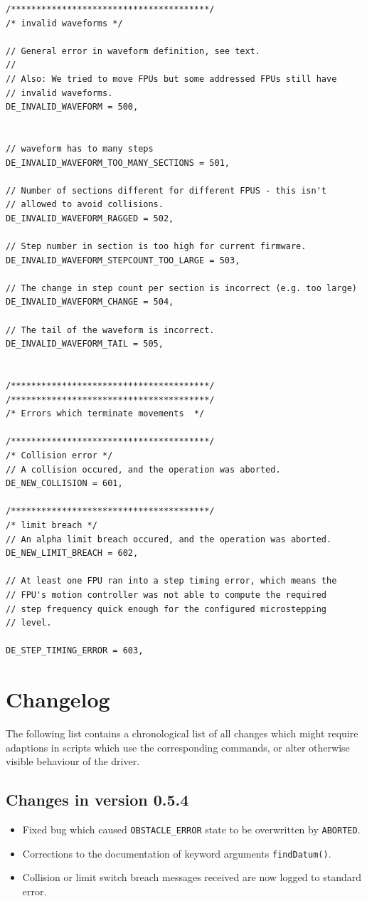 \documentclass[11pt,a4paper]{report}
\begin{document}
\begin{verbatim}
/***************************************/
/* invalid waveforms */

// General error in waveform definition, see text.
//
// Also: We tried to move FPUs but some addressed FPUs still have
// invalid waveforms.
DE_INVALID_WAVEFORM = 500,


// waveform has to many steps
DE_INVALID_WAVEFORM_TOO_MANY_SECTIONS = 501,

// Number of sections different for different FPUS - this isn't
// allowed to avoid collisions.
DE_INVALID_WAVEFORM_RAGGED = 502,

// Step number in section is too high for current firmware.
DE_INVALID_WAVEFORM_STEPCOUNT_TOO_LARGE = 503,

// The change in step count per section is incorrect (e.g. too large)
DE_INVALID_WAVEFORM_CHANGE = 504,

// The tail of the waveform is incorrect.
DE_INVALID_WAVEFORM_TAIL = 505,


/***************************************/
/***************************************/
/* Errors which terminate movements  */

/***************************************/
/* Collision error */
// A collision occured, and the operation was aborted.
DE_NEW_COLLISION = 601,

/***************************************/
/* limit breach */
// An alpha limit breach occured, and the operation was aborted.
DE_NEW_LIMIT_BREACH = 602,

// At least one FPU ran into a step timing error, which means the
// FPU's motion controller was not able to compute the required
// step frequency quick enough for the configured microstepping
// level.

DE_STEP_TIMING_ERROR = 603,
\end{verbatim}

\section{Changelog}

The following list contains a chronological list of all changes which
might require adaptions in scripts which use the corresponding
commands, or alter otherwise visible behaviour of the driver.

\subsection*{Changes in version 0.5.4}
\begin{itemize}
\item Fixed bug which caused \texttt{OBSTACLE\_ERROR} state to be overwritten by \texttt{ABORTED}.
\item Corrections to the documentation of keyword arguments \texttt{findDatum()}.
\item Collision or limit switch breach messages received are now logged to standard error.
\end{itemize}
\end{document}
